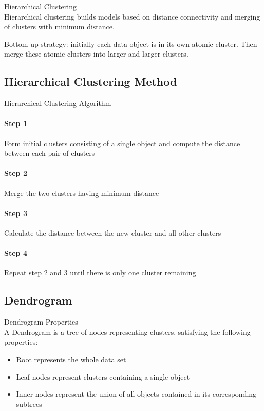 \begin{definition}{Hierarchical Clustering}\\
Hierarchical clustering builds models based on distance connectivity and merging of clusters with minimum distance.

Bottom-up strategy: initially each data object is in its own atomic cluster. Then merge these atomic clusters into larger and larger clusters.
\end{definition}

\subsection{Hierarchical Clustering Method}

\begin{KR}{Hierarchical Clustering Algorithm}\\
\paragraph{Step 1}
Form initial clusters consisting of a single object and compute the distance between each pair of clusters

\paragraph{Step 2}
Merge the two clusters having minimum distance

\paragraph{Step 3}
Calculate the distance between the new cluster and all other clusters

\paragraph{Step 4}
Repeat step 2 and 3 until there is only one cluster remaining
\end{KR}

\subsection{Dendrogram}

\begin{definition}{Dendrogram Properties}\\
A Dendrogram is a tree of nodes representing clusters, satisfying the following properties:
\begin{itemize}
    \item Root represents the whole data set
    \item Leaf nodes represent clusters containing a single object
    \item Inner nodes represent the union of all objects contained in its corresponding subtrees
\end{itemize}
\end{definition}


